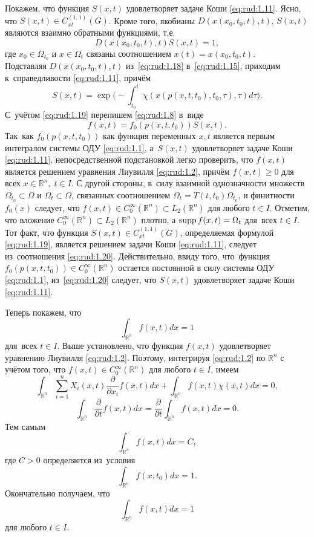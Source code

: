  Покажем, что функция $S(x,t)$ удовлетворяет задаче Коши \eqref{eq:rud:1.11}. 
  Ясно, что $S(x,t)\in C_{xt}^{(1,1)}(G)$. Кроме того, якобианы  $D(x(x_0,t_0,t),t)$, $S(x,t)$ являются взаимно обратными функциями,  т.е.
 \begin{equation}
 D(x(x_0,t_0,t),t) S(x,t)=1,\label{eq:rud:1.18}
 \end{equation}
 где $x_0\in\Omega_{t_0}$ и $x\in\Omega_t$ связаны соотношением  $x(t)=x(x_0,t_0,t)$. \\
Подставляя $D(x(x_0,t_0,t),t)$ из~\eqref{eq:rud:1.18} в~\eqref{eq:rud:1.15},  приходим к~справедливости \eqref{eq:rud:1.11}, причём
 \begin{equation}
 S(x,t)=\exp{\biggl(-\int _{t_0}^{t}\chi(x(p(x,t,t_0),t_0,\tau),\tau)d\tau\biggr)}.\label{eq:rud:1.19}
 \end{equation}
 С~учётом \eqref{eq:rud:1.19} перепишем \eqref{eq:rud:1.8} в~виде
 \begin{equation}
 f(x,t)=f_0(p(x,t,t_0)) S(x,t).\label{eq:rud:1.20}
 \end{equation}
 Так~как $f_0(p(x,t,t_0))$ как функция переменных $x, t$ является
 первым интегралом системы ОДУ \eqref{eq:rud:1.1}, а~$S(x,t)$ удовлетворяет
 задаче Коши \eqref{eq:rud:1.11}, непосредственной подстановкой легко
 проверить, что $f(x,t)$ является решением уравнения Лиувилля
 \eqref{eq:rud:1.2}, причём $f(x,t)\ge 0$ для всех $x\in \mathbb R^n,\; t\in I$. С
 другой стороны, в~силу взаимной однозначности множеств
 $\Omega_{t_0}\subset\Omega$ и $\Omega_t\subset\Omega$, связанных
 соотношением $\Omega_t=T(t,t_0)\Omega_{t_0}$, и финитности $f_0(x)$ следует, что $f(x,t)\in C_0^{\infty}(\mathbb R^n)\subset L_2(\mathbb R^n)$ для
 любого $t\in I$. Отметим, что вложение $C_0^{\infty}(\mathbb R^n)\subset
 L_2(\mathbb R^n)$ плотно, а $\mathop{\rm supp}{f(x,t)}=\Omega_t$ для~всех $t\in I$.
 Тот факт, что функция $S(x,t)\in C_{xt}^{(1,1)}(G)$, определяемая
 формулой \eqref{eq:rud:1.19}, является решением задачи Коши \eqref{eq:rud:1.11}, следует из~соотношения
  \eqref{eq:rud:1.20}. Действительно, ввиду того, что~функция $f_0(p(x,t,t_0))\in
 C_0^{\infty}(\mathbb R^n)$ остается постоянной в силу системы ОДУ \eqref{eq:rud:1.1},
 из~\eqref{eq:rud:1.20} следует, что $S(x,t)$ удовлетворяет задаче Коши
 \eqref{eq:rud:1.11}.

 Теперь покажем, что
$$\int _{\mathbb R^n}f(x,t)dx=1$$ для~всех $t\in I$. Выше установлено, что
 функция $f(x,t)$ удовлетворяет уравнению Лиувилля \eqref{eq:rud:1.2}. Поэтому,
 интегрируя \eqref{eq:rud:1.2} по $\mathbb R^n$ с учётом того, что $f(x,t)\in
 C_0^{\infty}(\mathbb R^n)$ для любого $t\in I$, имеем
 $$
 \int _{\mathbb R^n}\sum\limits_{i=1}^{n} X_i(x,t)\frac{\partial}{\partial
 x_i}f(x,t)dx+\int _{\mathbb R^n}f(x,t)\chi(x,t)dx=0,
 $$
 $$
 \int _{\mathbb R^n}\frac{\partial}{\partial
 t}f(x,t)dx=\frac{\partial}{\partial t}\int _{\mathbb R^n}f(x,t)dx=0.
 $$
 Тем самым 
 $$\int _{\mathbb R^n}f(x,t)dx=C,$$ где $C>0$ определяется из~условия   
 $$\int _{\mathbb R^n}f(x,t_0)dx=1.$$ Окончательно получаем, что $$\int _{\mathbb R^n}f(x,t)dx=1$$ для любого $t\in  I$.

